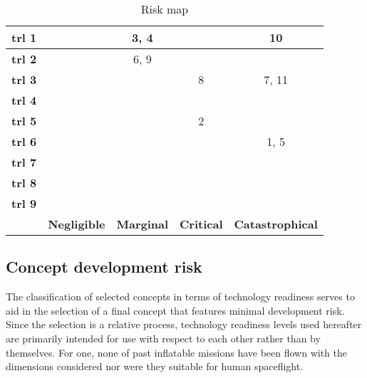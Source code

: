 \begin{table}[H]
	\centering
	\caption{Risk map}
	\label{tab:riskmap}
	\begin{tabular}{|c|c|c|c|c|} %
		\hline
		\textbf{\gls{trl} 1} & \cellcolor{green!70} & \cellcolor{yellow!75} 3, 4 & \cellcolor{red!60} & \cellcolor{red!60} 10 \\ \hline
		\textbf{\gls{trl} 2} & \cellcolor{green!70} & \cellcolor{yellow!75} 6, 9 & \cellcolor{red!60} & \cellcolor{red!60} \\ \hline
		\textbf{\gls{trl} 3} & \cellcolor{green!70} & \cellcolor{yellow!75} & \cellcolor{red!60} 8 & \cellcolor{red!60} 7, 11 \\ \hline
		\textbf{\gls{trl} 4} & \cellcolor{green!70} & \cellcolor{yellow!75} & \cellcolor{yellow!75} & \cellcolor{yellow!75} \\ \hline
		\textbf{\gls{trl} 5} & \cellcolor{green!70} & \cellcolor{green!70} & \cellcolor{yellow!75} 2 & \cellcolor{yellow!75} \\ \hline
		\textbf{\gls{trl} 6} & \cellcolor{green!70} & \cellcolor{green!70} & \cellcolor{green!70} & \cellcolor{green!70} 1, 5 \\ \hline
		\textbf{\gls{trl} 7} & \cellcolor{green!70} & \cellcolor{green!70} & \cellcolor{green!70} & \cellcolor{green!70} \\ \hline
		\textbf{\gls{trl} 8} & \cellcolor{green!70} & \cellcolor{green!70} & \cellcolor{green!70} & \cellcolor{green!70} \\ \hline
		\textbf{\gls{trl} 9} & \cellcolor{green!70} & \cellcolor{green!70} & \cellcolor{green!70} & \cellcolor{green!70} \\ \hline
		 & \textbf{Negligible} & \textbf{Marginal} & \textbf{Critical} & \textbf{Catastrophical} \\ \hline
	\end{tabular}
\end{table}

\subsection{Concept development risk}
\label{subsec:developrisk}
The classification of selected concepts in terms of technology readiness serves to aid in the selection of a final concept that features minimal development risk. Since the selection is a relative process, technology readiness levels used hereafter are primarily intended for use with respect to each other rather than by themselves. For one, none of past inflatable missions have been flown with the dimensions considered nor were they suitable for human spaceflight.

